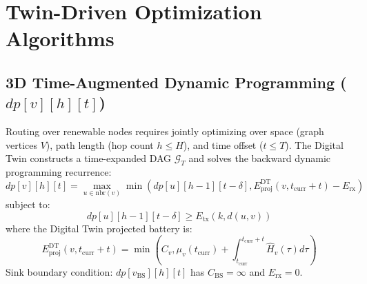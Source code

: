 \documentclass[journal]{IEEEtran}
\begin{document}
\section{Twin-Driven Optimization Algorithms}

\subsection{3D Time-Augmented Dynamic Programming ($dp[v][h][t]$)}
Routing over renewable nodes requires jointly optimizing over space (graph vertices $V$), path length (hop count $h \le H$), and time offset ($t \le T$). The Digital Twin constructs a time-expanded DAG $\mathcal{G}_T$ and solves the backward dynamic programming recurrence:
\begin{equation}
dp[v][h][t] = \max_{u \in \text{nbr}(v)} \min\left( dp[u][h-1][t-\delta], E_{\text{proj}}^{\text{DT}}(v, t_{\text{curr}} + t) - E_{\text{rx}} \right)
\end{equation}
subject to:
\begin{equation}
dp[u][h-1][t-\delta] \ge E_{\text{tx}}(k, d(u, v))
\end{equation}
where the Digital Twin projected battery is:
\begin{equation}
E_{\text{proj}}^{\text{DT}}(v, t_{\text{curr}} + t) = \min\left( C_v, \mu_v(t_{\text{curr}}) + \int_{t_{\text{curr}}}^{t_{\text{curr}}+t} \hat{H}_v(\tau) d\tau \right)
\end{equation}
Sink boundary condition: $dp[v_{\text{BS}}][h][t]$ has $C_{\text{BS}} = \infty$ and $E_{\text{rx}} = 0$.
\end{document}
